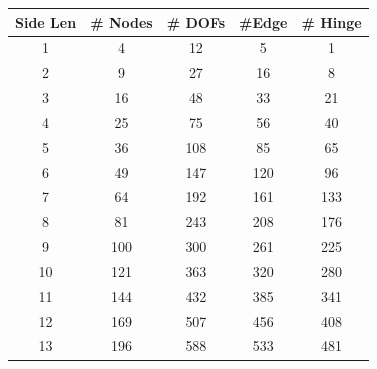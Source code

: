 \documentclass[letterpaper, 10 pt, conference]{ieeeconf}  %
\begin{document}
\onecolumn
\begin{figure}
        \begin{minipage}[b]{.45\linewidth}
                \centering
                \begin{tabular}{|c|c|c|c|c|}
                \hline
                \textbf{Side Len} & \textbf{\# Nodes} & \textbf{\# DOFs} & \textbf{\#Edge} & \textbf{\# Hinge} \\ \hline
                1                    & 4                    & 12                  & 5                   & 1                    \\ \hline
                2                    & 9                    & 27                  & 16                  & 8                    \\ \hline
                3                    & 16                   & 48                  & 33                  & 21                   \\ \hline
                4                    & 25                   & 75                  & 56                  & 40                   \\ \hline
                5                    & 36                   & 108                 & 85                  & 65                   \\ \hline
                6                    & 49                   & 147                 & 120                 & 96                   \\ \hline
                7                    & 64                   & 192                 & 161                 & 133                  \\ \hline
                8                    & 81                   & 243                 & 208                 & 176                  \\ \hline
                9                    & 100                  & 300                 & 261                 & 225                  \\ \hline
                10                   & 121                  & 363                 & 320                 & 280                  \\ \hline
                11                   & 144                  & 432                 & 385                 & 341                  \\ \hline
                12                   & 169                  & 507                 & 456                 & 408                  \\ \hline
                13                   & 196                  & 588                 & 533                 & 481                  \\ \hline

\end{tabular}
\end{minipage}
\end{figure}
\end{document}
